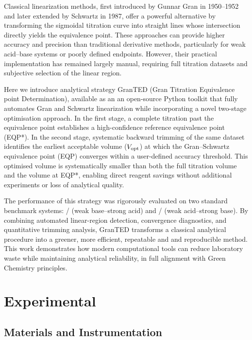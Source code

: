 \documentclass[twoside,twocolumn,9pt]{article}
\begin{document}
Classical linearization methods, first introduced by Gunnar Gran in 1950--1952 and later extended by Schwartz in 1987, offer a powerful alternative by transforming the sigmoidal titration curve into straight lines whose intersection directly yields the equivalence point.
These approaches can provide higher accuracy and precision than traditional derivative methods, particularly for weak acid--base systems or poorly defined endpoints.
However, their practical implementation has remained largely manual, requiring full titration datasets and subjective selection of the linear region.

Here we introduce analytical strategy \textsf{GranTED} (Gran Titration Equivalence point Determination), available as an an open-source Python toolkit that fully automates Gran and Schwartz linearization while incorporating a novel two-stage optimisation approach.
In the first stage, a complete titration past the equivalence point establishes a high-confidence reference equivalence point (EQP*).
In the second stage, systematic backward trimming of the same dataset identifies the earliest acceptable volume (\(V_{\rm opt}\)) at which the Gran--Schwartz equivalence point (EQP) converges within a user-defined accuracy threshold.
This optimised volume is systematically smaller than both the full titration volume and the volume at EQP*, enabling direct reagent savings without additional experiments or loss of analytical quality.

The performance of this strategy was rigorously evaluated on two standard benchmark systems: / (weak base--strong acid) and / (weak acid--strong base). By combining automated linear-region detection, convergence diagnostics, and quantitative trimming analysis, \textsf{GranTED} transforms a classical analytical procedure into a greener, more efficient, repeatable and and reproducible method.
This work demonstrates how modern computational tools can reduce laboratory waste while maintaining analytical reliability, in full alignment with Green Chemistry principles.

\section*{Experimental}

\subsection*{Materials and Instrumentation}
\end{document}
